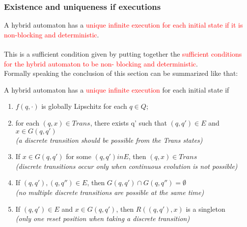 \subsubsection{Existence and uniqueness if executions}
A hybrid automaton has a \textcolor{red}{unique infinite execution for each initial state if it is non-blocking and deterministic}.\\
\\
This is a sufficient condition given by  putting together the \textcolor{red}{sufficient conditions for the hybrid automaton to be non- blocking and deterministic}.\\
Formally speaking the conclusion of this section can be summarized like that:
\begin{tcolorbox}
	A hybrid automaton has a \textcolor{red}{unique infinite execution} for each initial state if
	\begin{enumerate}
		\item $f(q,\cdot)$ is globally Lipschitz for each $q\in Q$;
		\item for each $(q,x)\in Trans$, there exists q' such that $(q,q')\in E$ and $x \in G(q,q')$ \\ \emph{(a discrete transition should be possible from the Trans states)
		}
		\item If $x \in G(q,q')$ for some $(q,q') in E$, then $(q,x) \in Trans$\\ \emph{(discrete transitions occur only when continuous evolution is not possible)}
		\item If $(q,q'),(q,q'')\in E$, then $G(q,q')\cap G(q,q'')=\emptyset$ \\ \emph{(no multiple discrete transitions are possible at the same time)}
		\item If $(q,q')\in E$ and $x\in G(q,q')$, then $R((q,q'),x)$ is a singleton\\ \emph{(only one reset position when taking a discrete transition)}
	\end{enumerate}
\end{tcolorbox}

